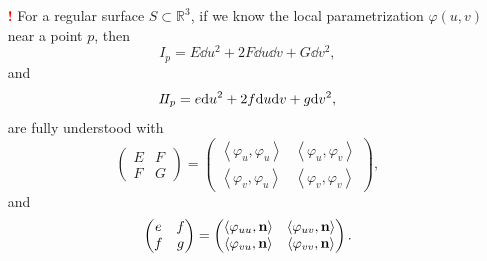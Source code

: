 \begin{itemize}
    \item[{\Large\textcolor{red}{\textbf{!}}}]
    For a regular surface \(S\subset \mathbb{R}^3\), 
    if we know the local parametrization \(\varphi(u,v)\) near 
    a point \(p\), then 
    \[
        I_p=E\dd u^2+2F \dd u\dd v+G\dd v^2,
    \]
    and 
    \[
        I\!I_p=e\dd u^2+2f\dd u\dd v+g\dd v^2,
    \]
    are fully understood with
    \[
        \begin{pmatrix}
            E&F\\
            F&G
        \end{pmatrix}
        =\begin{pmatrix}
            \left\langle\varphi_u,\varphi_u\right\rangle
            &
            \left\langle\varphi_u,\varphi_v\right\rangle
            \\
            \left\langle\varphi_v,\varphi_u\right\rangle
            &
            \left\langle\varphi_v,\varphi_v\right\rangle
        \end{pmatrix},
    \]
    and 
    \[
        \begin{pmatrix}
            e&f\\
            f&g
        \end{pmatrix}
        =\begin{pmatrix}
            \left\langle\varphi_{uu},\vb{n}\right\rangle&
            \left\langle\varphi_{uv},\vb{n}\right\rangle\\
            \left\langle\varphi_{vu},\vb{n}\right\rangle &
            \left\langle\varphi_{vv},\vb{n}\right\rangle
        \end{pmatrix}.
    \]
\end{itemize}
